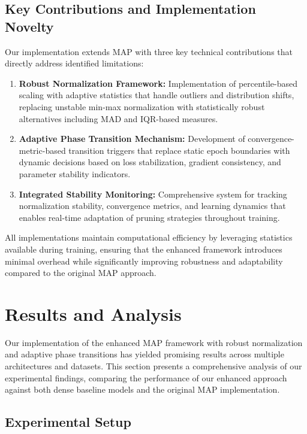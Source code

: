 \documentclass[12pt,a4paper]{report}
\begin{document}
\section{Key Contributions and Implementation Novelty}
Our implementation extends MAP with three key technical contributions that directly address identified limitations:
\begin{enumerate}
    \item \textbf{Robust Normalization Framework:} Implementation of percentile-based scaling with adaptive statistics that handle outliers and distribution shifts, replacing unstable min-max normalization with statistically robust alternatives including MAD and IQR-based measures.
    \item \textbf{Adaptive Phase Transition Mechanism:} Development of convergence-metric-based transition triggers that replace static epoch boundaries with dynamic decisions based on loss stabilization, gradient consistency, and parameter stability indicators.
    \item \textbf{Integrated Stability Monitoring:} Comprehensive system for tracking normalization stability, convergence metrics, and learning dynamics that enables real-time adaptation of pruning strategies throughout training.
\end{enumerate}
All implementations maintain computational efficiency by leveraging statistics available during training, ensuring that the enhanced framework introduces minimal overhead while significantly improving robustness and adaptability compared to the original MAP approach.

\clearpage

\chapter{Results and Analysis}

Our implementation of the enhanced MAP framework with robust normalization and adaptive phase transitions has yielded promising results across multiple architectures and datasets. This section presents a comprehensive analysis of our experimental findings, comparing the performance of our enhanced approach against both dense baseline models and the original MAP implementation.

\section{Experimental Setup}
\end{document}
